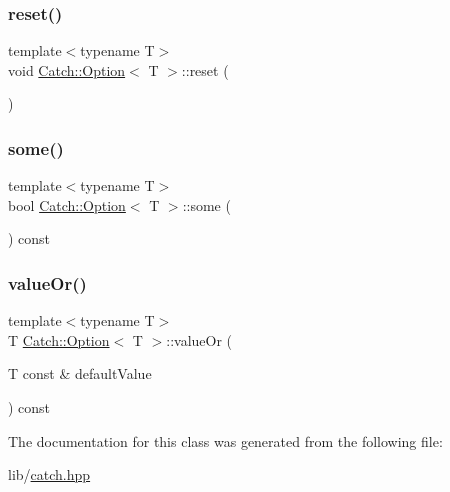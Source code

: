 \hypertarget{class_catch_1_1_option_a37b4e0e5d4d56296adacd267a616f4e0}{}\label{class_catch_1_1_option_a37b4e0e5d4d56296adacd267a616f4e0} 
\subsubsection{\texorpdfstring{reset()}{reset()}}
{\footnotesize\ttfamily template$<$typename T$>$ \\
void \hyperlink{class_catch_1_1_option}{Catch\+::\+Option}$<$ T $>$\+::reset (\begin{DoxyParamCaption}{ }\end{DoxyParamCaption})\hspace{0.3cm}{\ttfamily [inline]}}

\hypertarget{class_catch_1_1_option_a97c95829afbe92f2bcc5fd75b32c0825}{}\label{class_catch_1_1_option_a97c95829afbe92f2bcc5fd75b32c0825} 
\subsubsection{\texorpdfstring{some()}{some()}}
{\footnotesize\ttfamily template$<$typename T$>$ \\
bool \hyperlink{class_catch_1_1_option}{Catch\+::\+Option}$<$ T $>$\+::some (\begin{DoxyParamCaption}{ }\end{DoxyParamCaption}) const\hspace{0.3cm}{\ttfamily [inline]}}

\hypertarget{class_catch_1_1_option_a8d9ae2e30b0eb76fe134a6fbc8423124}{}\label{class_catch_1_1_option_a8d9ae2e30b0eb76fe134a6fbc8423124} 
\subsubsection{\texorpdfstring{value\+Or()}{valueOr()}}
{\footnotesize\ttfamily template$<$typename T$>$ \\
T \hyperlink{class_catch_1_1_option}{Catch\+::\+Option}$<$ T $>$\+::value\+Or (\begin{DoxyParamCaption}\item[{T const \&}]{default\+Value }\end{DoxyParamCaption}) const\hspace{0.3cm}{\ttfamily [inline]}}



The documentation for this class was generated from the following file\+:\begin{DoxyCompactItemize}
\item 
lib/\hyperlink{catch_8hpp}{catch.\+hpp}\end{DoxyCompactItemize}
